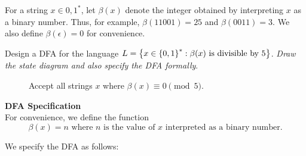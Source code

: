 \begin{problem}
  For a string $x \in {0, 1}^*$, let $\beta(x)$ denote the integer obtained
  by interpreting $x$ as a binary number.
  Thus, for example, $\beta(11001) = 25$ and $\beta(0011) = 3$.
  We also define $\beta(\epsilon) = 0$ for convenience.
  
  \noindent
  Design a DFA for the language $L = \left\{ x \in \left\{0, 1\right\}^* : \beta(x) \text{ is divisible by } 5\right\}$.
  \emph{Draw the state diagram and also specify the DFA formally}.
\end{problem}
\begin{Answer}
  \begin{figure}[H]
    \centering
    \caption{Accept all strings $x$ where $\beta(x) \equiv 0 \pmod 5$.}
    \label{fig:divisible-by-5}
  \end{figure}
  \textbf{DFA Specification}\\
  For convenience, we define the function
  \[ \beta(x) = n \text{ where $n$ is the value of $x$ interpreted as a binary number.}\]
  
  \step
  We specify the DFA as follows:


\end{Answer}
